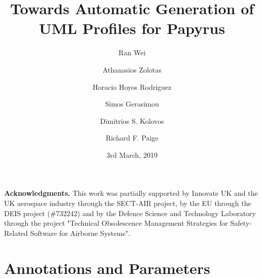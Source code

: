 \documentclass[global]{svjour}
\begin{document}
\title{Towards Automatic Generation of UML Profiles for Papyrus}

\author{Ran Wei \and Athanasios Zolotas \and Horacio Hoyos Rodriguez \and Simos Gerasimou \and Dimitrios S. Kolovos \and Richard F. Paige
	}

\date{3rd March, 2019}
\maketitle{}










\noindent\textbf{Acknowledgments.}
This work was partially supported by Innovate UK and the UK aerospace industry through the SECT-AIR project, by the EU through the DEIS project (\#732242) and by the Defence Science and Technology Laboratory through the project "Technical Obsolescence Management Strategies for Safety-Related Software for Airborne Systems".
\appendix
\section{Annotations and Parameters}

\clearpage


\end{document}
